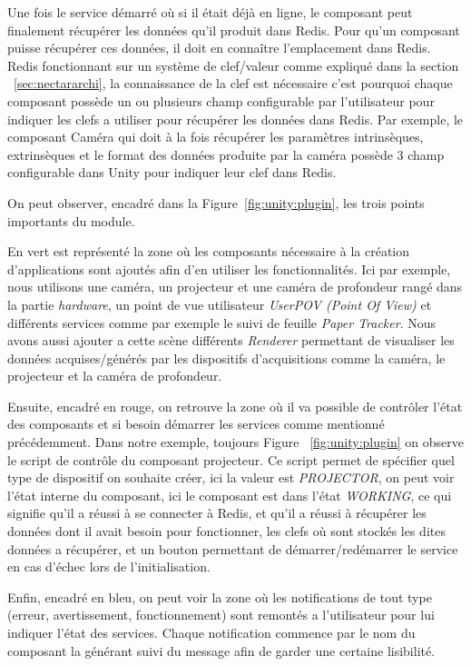 Une fois le service démarré où si il était déjà en ligne, le composant peut finalement récupérer les données qu'il produit dans Redis. Pour qu'un composant puisse récupérer ces données, il doit en connaître l'emplacement dans Redis. Redis fonctionnant sur un système de clef/valeur comme expliqué dans la section ~\ref{sec:nectararchi}, la connaissance de la clef est nécessaire c'est pourquoi chaque composant possède un ou plusieurs champ configurable par l'utilisateur pour indiquer les clefs a utiliser pour récupérer les données dans Redis. Par exemple, le composant Caméra qui doit à la fois récupérer les paramètres intrinsèques, extrinsèques et le format des données produite par la caméra possède 3 champ configurable dans Unity pour indiquer leur clef dans Redis.

On peut observer, encadré dans la Figure~\ref{fig:unity:plugin}, les trois points importants du module. 

En vert est représenté la zone où les composants nécessaire à la création d'applications sont ajoutés afin d'en utiliser les fonctionnalités. Ici par exemple, nous utilisons une caméra, un projecteur et une caméra de profondeur rangé dans la partie \emph{hardware}, un point de vue utilisateur \emph{UserPOV (Point Of View)} et différents services comme par exemple le suivi de feuille \emph{Paper Tracker}. Nous avons aussi ajouter a cette scène différents \emph{Renderer} permettant de visualiser les données acquises/générés par les dispositifs d'acquisitions comme la caméra, le projecteur et la caméra de profondeur.

Ensuite, encadré en rouge, on retrouve la zone où il va possible de contrôler l'état des composants et si besoin démarrer les services comme mentionné précédemment. Dans notre exemple, toujours Figure ~\ref{fig:unity:plugin} on observe le script de contrôle du composant projecteur. Ce script permet de spécifier quel type de dispositif on souhaite créer, ici la valeur est \emph{PROJECTOR}, on peut voir l'état interne du composant, ici le composant est dans l'état \emph{WORKING}, ce qui signifie qu'il a réussi à se connecter à  Redis, et qu'il a réussi à récupérer les données dont il avait besoin pour fonctionner, les clefs où sont stockés les dites données a récupérer, et un bouton permettant de démarrer/redémarrer le service en cas d'échec lors de l'initialisation.

Enfin, encadré en bleu, on peut voir la zone où les notifications de tout type (erreur, avertissement, fonctionnement) sont remontés a l'utilisateur pour lui indiquer l'état des services. Chaque notification commence par le nom du composant la générant suivi du message afin de garder une certaine lisibilité.

